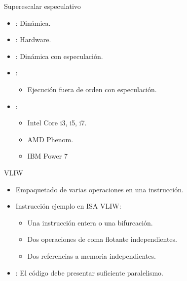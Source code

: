 \begin{frame}[t]{Superescalar especulativo}
\begin{itemize}
  \item {}: Dinámica.
  \item {}: Hardware.
  \item {}: Dinámica con especulación.
  \item {}:
    \begin{itemize}
      \item Ejecución fuera de orden con especulación.
    \end{itemize}
  
  \item {}: 
    \begin{itemize}
      \item Intel Core i3, i5, i7. 
      \item AMD Phenom. 
      \item IBM Power 7
    \end{itemize}
\end{itemize}
\end{frame}

\begin{frame}[t]{VLIW}
\begin{itemize}
  \item Empaquetado de varias operaciones en una instrucción.

  \item Instrucción ejemplo en ISA VLIW:
    \begin{itemize}
      \item Una instrucción entera o una bifurcación.
      \item Dos operaciones de coma flotante independientes.
      \item Dos referencias a memoria independientes.
    \end{itemize}

  \item {}: El código debe presentar suficiente paralelismo.
\end{itemize}
\end{frame}

